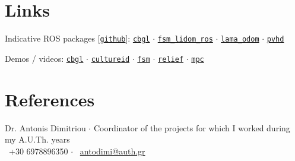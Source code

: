 \documentclass[a4paper,10pt,twoside]{article}
\begin{document}
\section{Links}

Indicative ROS packages [\href{https://github.com/li9i}{\texttt{github}}]:
\href{https://github.com/li9i/cbgl}{\texttt{cbgl}} $\cdot$
\href{https://github.com/li9i/fsm\_lidom\_ros}{\texttt{fsm\_lidom\_ros}} $\cdot$
\href{https://github.com/li9i/lama\_odom}{\texttt{lama\_odom}} $\cdot$
\href{https://github.com/li9i/pandora\_vision\_2014/tree/hydro-devel/pandora\_vision\_hole\_detector}{\texttt{pvhd}}

Demos / videos: \href{https://www.youtube.com/watch?v=xaDKjI0WkDc}{\texttt{cbgl}} $\cdot$ \href{https://cultureid.web.auth.gr/?page\_id=200&lang=en}{\texttt{cultureid}} $\cdot$ \href{https://www.youtube.com/watch?v=hB4qsHCEXGI}{\texttt{fsm}} $\cdot$ \href{https://relief.web.auth.gr/}{\texttt{relief}} $\cdot$ \href{https://www.youtube.com/watch?v=937OZez1iN8}{\texttt{mpc}}
\\

\section{References}
Dr. Antonis Dimitriou $\cdot$ Coordinator of the projects for which I worked during my A.U.Th. years \\
\faPhone \ +30 6978896350 $\cdot$ \faEnvelopeO \ \href{mailto:antodimi@auth.gr}{antodimi@auth.gr} \\
\end{document}
